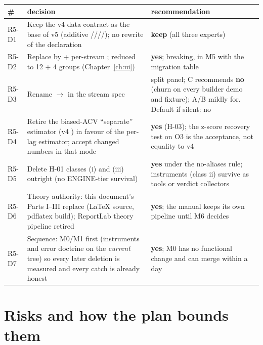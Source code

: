 \begin{longtable}{@{}P{12mm}P{74mm}P{68mm}@{}}
\toprule
\# & decision & recommendation\\
\midrule
R5-D1 & Keep the v4 data contract as the base of v5 (additive ////); no rewrite of the declaration & \textbf{keep} (all three experts)\\
R5-D2 & Replace  by  + per-stream ;  reduced to 12 + 4 groups (Chapter~\ref{ch:ui}) & \textbf{yes}; breaking, in M5 with the migration table\\
R5-D3 & Rename  $\to$  in the stream spec & split panel; C recommends \textbf{no} (churn on every builder demo and fixture); A/B mildly for. Default if silent: no\\
R5-D4 & Retire the biased-ACV ``separate'' estimator (v4 ) in favour of the per-lag estimator; accept changed numbers in that mode & \textbf{yes} (H-03); the z-score recovery test on O3 is the acceptance, not equality to v4\\
R5-D5 & Delete H-01 classes (i) and (iii) outright (no ENGINE-tier survival) & \textbf{yes} under the no-aliases rule; instruments (class ii) survive as  tools or verdict collectors\\
R5-D6 & Theory authority: this document's Parts I--III replace  (LaTeX source, pdflatex build); ReportLab theory pipeline retired & \textbf{yes}; the manual keeps its own pipeline until M6 decides\\
R5-D7 & Sequence: M0/M1 first (instruments and error doctrine on the \emph{current} tree) so every later deletion is measured and every catch is already honest & \textbf{yes}; M0 has no functional change and can merge within a day\\
\bottomrule
\end{longtable}

\section{Risks and how the plan bounds them}

